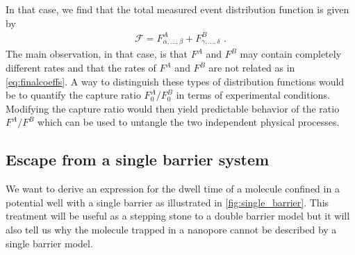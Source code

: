 In that case, we find that the total measured event distribution function is given by
%
\begin{align}\label{eq:two_population_distribution}
    \mathcal{F} = F^A_{\alpha,\ldots,\beta} + F^B_{\gamma,\ldots,\delta}
    \text{ .}
\end{align}
%
The main observation, in that case, is that $F^A$ and $F^B$ may contain completely different rates and that the
rates of $F^A$ and $F^B$ are not related as in \cref{eq:finalcoeffs}. A way to distinguish these types of
distribution functions would be to quantify the capture ratio $F^A_0/F^B_0$ in terms of experimental
conditions. Modifying the capture ratio would then yield predictable behavior of the ratio $F^A/F^B$ which can
be used to untangle the two independent physical processes.


\subsection{Escape from a single barrier system}
%
\label{sec:trapping_appendix:single_barrier_system}
%

We want to derive an expression for the dwell time of a molecule confined in a potential well with a single
barrier as illustrated in \cref{fig:single_barrier}. This treatment will be useful as a stepping stone to a
double barrier model but it will also tell us why the molecule trapped in a nanopore cannot be described by a
single barrier model.

